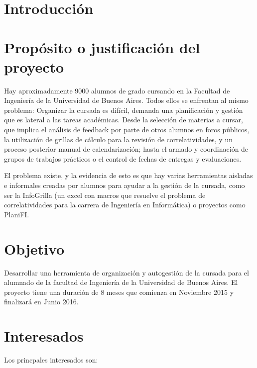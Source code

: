 \documentclass[a4paper,11pt]{article}
\begin{document}

\section{Introducción}
\baselineskip=18pt

\section{Propósito o justificación del proyecto}

Hay aproximadamente 9000 alumnos de grado cursando en la Facultad de Ingeniería
de la Universidad de Buenos Aires. Todos ellos se enfrentan al mismo problema:
Organizar la cursada es difícil, demanda una planificación y gestión que es
lateral a las tareas académicas. Desde la selección de materias a cursar, que
implica el análisis de feedback por parte de otros alumnos en foros públicos,
la utilización de grillas de cálculo para la revisión de correlatividades, y un
proceso posterior manual de calendarización; hasta el armado y coordinación de
grupos de trabajos prácticos o el control de fechas de entregas y evaluaciones.

El problema existe, y la evidencia de esto es que hay varias herramientas
aisladas e informales creadas por alumnos para ayudar a la gestión de la
cursada, como ser la InfoGrilla (un excel con macros que resuelve el problema
de correlatividades para la carrera de Ingeniería en Informática) o proyectos
como PlaniFI.

\section{Objetivo}

Desarrollar una herramienta de organización y autogestión de la cursada para el
alumnado de la facultad de Ingeniería de la Universidad de Buenos Aires. El
proyecto tiene una duración de 8 meses que comienza en Noviembre 2015 y
finalizará en Junio 2016. 

\section{Interesados}

Los princpales interesados son:
\end{document}
